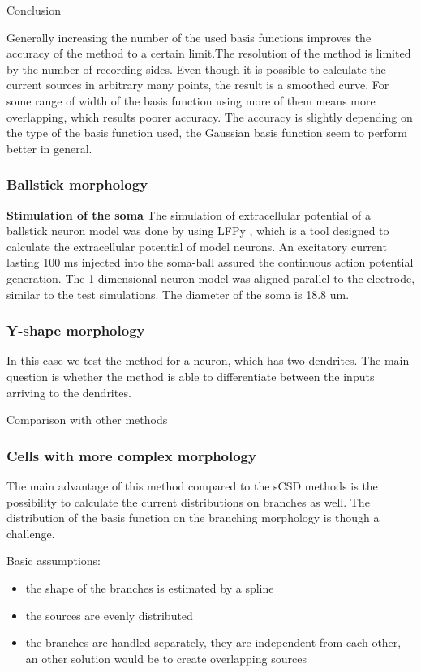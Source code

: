 \documentclass[12pt,a4paper]{article}
\begin{document}
Conclusion

Generally increasing the number of the used basis functions improves the accuracy of the method to a certain limit.The resolution of the method is limited by the number of recording sides. Even though it is possible to calculate the current sources in arbitrary many points, the result is a smoothed curve. For some range of width of the basis function using more of them means more overlapping, which results poorer accuracy. The accuracy is slightly depending on the type of the basis function used, the Gaussian basis function seem to perform better in general.



\subsubsection{Ballstick morphology}


\textbf{Stimulation of the soma}
The simulation of extracellular potential of a ballstick neuron model was done by using LFPy \cite{LFPy}, which is a tool designed to calculate the extracellular potential of model neurons. An excitatory current lasting 100 ms injected into the soma-ball assured the continuous action potential generation.  The 1 dimensional neuron model was aligned parallel to the electrode, similar to the test simulations. The diameter of the soma is 18.8 um. 

\subsubsection{Y-shape morphology}
In this case we test the method for a neuron, which has two dendrites.
The main question is whether the method is able to differentiate between the inputs arriving to the dendrites. 

Comparison with other methods

\subsubsection{Cells with more complex morphology}
The main advantage of this method compared to the sCSD methods is the possibility to calculate the current distributions on branches as well. The distribution of the basis function on the branching morphology is though a challenge.

Basic assumptions:
\begin{itemize}
\item the shape of the branches is estimated by a spline
\item the sources are evenly distributed
\item the branches are handled separately, they are independent from each other, an other solution would be to create overlapping sources
\end{itemize}
\end{document}
